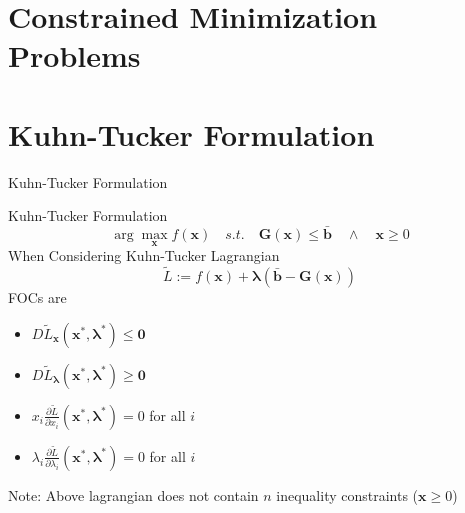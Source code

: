 \documentclass[final]{beamer}
\newcommand{\bd}{\mathbf}
\newcommand{\p}{\partial}
\begin{document}
\section{Constrained Minimization Problems} %
\label{sec:constrained_minimization_problems}

\section{Kuhn-Tucker Formulation} %
\label{sec:kuhn_tucker_formulation}
\begin{frame}[t]{Kuhn-Tucker Formulation}
	\begin{block}
		{Kuhn-Tucker Formulation}
		\[
			\arg\max_\bd{x} f(\bd{x}) \quad s.t.\quad \bd{G}(\bd{x})\le \bar{\bd{b}} \quad\land\quad \bd{x}\ge 0
		\] When Considering Kuhn-Tucker Lagrangian\[
			\tilde{L}:=f(\bd{x})+\bd{\lambda}(\bar{\bd{b}}-\bd{G}(\bd{x}))
		\]
		FOCs are
		\begin{itemize}
			\item $D\tilde{L}_{\bd{x}}(\bd{x^\ast},\bd{\lambda^\ast})\le \bd{0}$
			\item $D\tilde{L}_{\bd{\lambda}}(\bd{x^\ast},\bd{\lambda^\ast})\ge \bd{0}$
			\item $x_i \frac{\p \tilde L}{\p x_i}(\bd{x^\ast,\lambda^\ast})=0$ for all $i$
			\item $\lambda_i \frac{\p \tilde L}{\p \lambda_i}(\bd{x^\ast,\lambda^\ast})=0$ for all $i$
		\end{itemize}
	\end{block}
	Note: Above lagrangian does not contain $n$ inequality constraints ($\bd{x}\ge 0$)
\end{frame}
\end{document}
